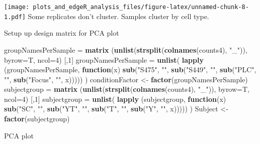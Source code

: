 \documentclass[]{article}
\newenvironment{Shaded}{\begin{snugshade}}{\end{snugshade}}
\newcommand{\KeywordTok}[1]{\textcolor[rgb]{0.13,0.29,0.53}{\textbf{#1}}}
\newcommand{\DataTypeTok}[1]{\textcolor[rgb]{0.13,0.29,0.53}{#1}}
\newcommand{\DecValTok}[1]{\textcolor[rgb]{0.00,0.00,0.81}{#1}}
\newcommand{\StringTok}[1]{\textcolor[rgb]{0.31,0.60,0.02}{#1}}
\newcommand{\ControlFlowTok}[1]{\textcolor[rgb]{0.13,0.29,0.53}{\textbf{#1}}}
\newcommand{\NormalTok}[1]{#1}
\begin{document}
\texttt{[image: plots\_and\_edgeR\_analysis\_files/figure-latex/unnamed-chunk-8-1.pdf]}
Some replicates don't cluster. Samples cluster by cell type.

Setup up design matrix for PCA plot

\begin{Shaded}
\begin{Highlighting}[]
\NormalTok{groupNamesPerSample =}\StringTok{ }\KeywordTok{matrix}\NormalTok{ (}\KeywordTok{unlist}\NormalTok{(}\KeywordTok{strsplit}\NormalTok{(}\KeywordTok{colnames}\NormalTok{(counts4), }\StringTok{"_"}\NormalTok{)), }\DataTypeTok{byrow=}\NormalTok{T, }\DataTypeTok{ncol=}\DecValTok{4}\NormalTok{) [,}\DecValTok{1}\NormalTok{]}
\NormalTok{groupNamesPerSample =}\StringTok{ }\KeywordTok{unlist}\NormalTok{( }\KeywordTok{lapply}\NormalTok{ (groupNamesPerSample, }\ControlFlowTok{function}\NormalTok{(x) }\KeywordTok{sub}\NormalTok{(}\StringTok{"S475"}\NormalTok{, }\StringTok{""}\NormalTok{, }\KeywordTok{sub}\NormalTok{(}\StringTok{"S449"}\NormalTok{, }\StringTok{""}\NormalTok{, }\KeywordTok{sub}\NormalTok{(}\StringTok{"PLC"}\NormalTok{, }\StringTok{""}\NormalTok{, }\KeywordTok{sub}\NormalTok{(}\StringTok{"Focus"}\NormalTok{, }\StringTok{""}\NormalTok{, x))))) )}
\NormalTok{conditionFactor  <-}\StringTok{ }\KeywordTok{factor}\NormalTok{(groupNamesPerSample)}
\NormalTok{subjectgroup =}\StringTok{ }\KeywordTok{matrix}\NormalTok{ (}\KeywordTok{unlist}\NormalTok{(}\KeywordTok{strsplit}\NormalTok{(}\KeywordTok{colnames}\NormalTok{(counts4), }\StringTok{"_"}\NormalTok{)), }\DataTypeTok{byrow=}\NormalTok{T, }\DataTypeTok{ncol=}\DecValTok{4}\NormalTok{) [,}\DecValTok{1}\NormalTok{]}
\NormalTok{subjectgroup =}\StringTok{ }\KeywordTok{unlist}\NormalTok{( }\KeywordTok{lapply}\NormalTok{ (subjectgroup, }\ControlFlowTok{function}\NormalTok{(x) }\KeywordTok{sub}\NormalTok{(}\StringTok{"SC"}\NormalTok{, }\StringTok{""}\NormalTok{, }\KeywordTok{sub}\NormalTok{(}\StringTok{"YT"}\NormalTok{, }\StringTok{""}\NormalTok{, }\KeywordTok{sub}\NormalTok{(}\StringTok{"T"}\NormalTok{, }\StringTok{""}\NormalTok{, }\KeywordTok{sub}\NormalTok{(}\StringTok{"Y"}\NormalTok{, }\StringTok{""}\NormalTok{, x))))) )}
\NormalTok{Subject <-}\StringTok{ }\KeywordTok{factor}\NormalTok{(subjectgroup)}
\end{Highlighting}
\end{Shaded}

PCA plot
\end{document}
